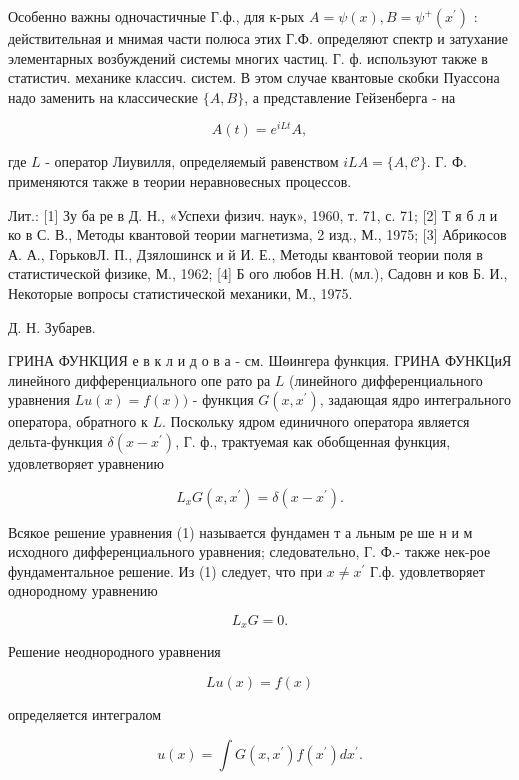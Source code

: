 \documentclass[10pt]{article}
\begin{document}
Особенно важны одночастичные Г.ф., для к-рых $A=\psi(x), B=\psi^{+}\left(x^{\prime}\right)$ : действительная и мнимая части полюса этих Г.Ф. определяют спектр и затухание элементарных возбуждений системы многих частиц. Г. ф. используют также в статистич. механике классич. систем. В этом случае квантовые скобки Пуассона надо заменить на классические $\{A, B\}$, а представление Гейзенберга - на



\[

A(t)=e^{i L t} A,

\]



где $L$ - оператор Лиувилля, определяемый равенством $i L A=\{A, \mathscr{C}\}$. Г. Ф. применяются также в теории неравновесных процессов.



Лит.: [1] Зу ба ре в Д. Н., «Успехи физич. наук», 1960, т. 71, с. 71; [2] Т я б л и ко в С. В., Методы квантовой теории магнетизма, 2 изд., М., 1975; [3] Абрикосов А. А., ГорьковЛ. П., Дзялошинск и й И. Е., Методы квантовой теории поля в статистической физике, М., 1962; [4] Б ого любов Н.Н. (мл.), Садовн и ков Б. И., Некоторые вопросы статистической механики, М., 1975.



Д. Н. Зубарев.



ГРИНА ФУНКЦИЯ е в к л и д о в а - см. Шөингера функция. ГРИНА ФУНКЦиЯ линейного дифференциального опе рато ра $L$ (линейного дифференциального уравнения $L u(x)=f(x))$ - функция $G\left(x, x^{\prime}\right)$, задающая ядро интегрального оператора, обратного к $L$. Поскольку ядром единичного оператора является дельта-функция $\delta\left(x-x^{\prime}\right)$, Г. ф., трактуемая как обобщенная функция, удовлетворяет уравнению



\[

L_{x} G\left(x, x^{\prime}\right)=\delta\left(x-x^{\prime}\right) .

\]



Всякое решение уравнения (1) называется фундамен т а льным ре ше н и м исходного дифференциального уравнения; следовательно, Г. Ф.- также нек-рое фундаментальное решение. Из (1) следует, что при $x \neq x^{\prime}$ Г.ф. удовлетворяет однородному уравнению



\[

L_{x} G=0 .

\]



Решение неоднородного уравнения



\[

L u(x)=f(x)

\]



определяется интегралом



\[

u(x)=\int G\left(x, x^{\prime}\right) f\left(x^{\prime}\right) d x^{\prime} .

\]
\end{document}

